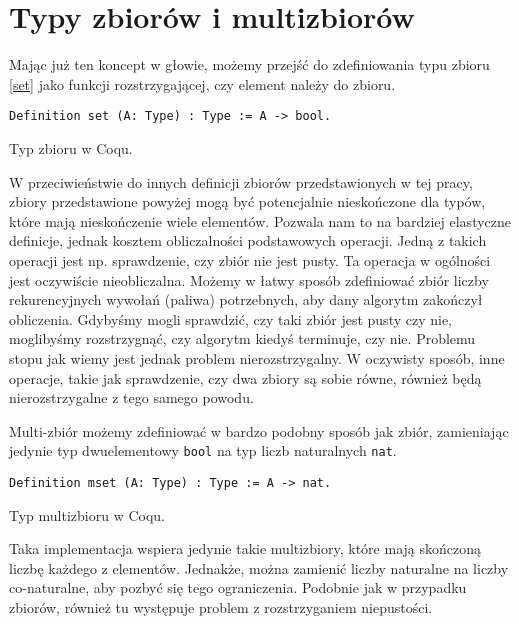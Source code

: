 \section{Typy zbiorów i multizbiorów}
Mając już ten koncept w głowie, możemy przejść do zdefiniowania typu zbioru \ref{set} jako funkcji rozstrzygającej, czy element należy do zbioru.
\begin{code}
\begin{verbatim}
Definition set (A: Type) : Type := A -> bool.
\end{verbatim}
\caption{Typ zbioru w Coqu.}
\label{set}
\end{code}
W przeciwieństwie do innych definicji zbiorów przedstawionych w tej pracy, zbiory przedstawione powyżej mogą być potencjalnie nieskończone dla typów, które mają nieskończenie wiele elementów. Pozwala nam to na bardziej elastyczne definicje, jednak kosztem obliczalności podstawowych operacji. Jedną z takich operacji jest np. sprawdzenie, czy zbiór nie jest pusty. Ta operacja w ogólności jest oczywiście nieobliczalna. Możemy w łatwy sposób zdefiniować zbiór liczby rekurencyjnych wywołań (paliwa) potrzebnych, aby dany algorytm zakończył obliczenia. Gdybyśmy mogli sprawdzić, czy taki zbiór jest pusty czy nie, moglibyśmy rozstrzygnąć, czy algorytm kiedyś terminuje, czy nie. Problemu stopu jak wiemy jest jednak problem nierozstrzygalny. W oczywisty sposób, inne operacje, takie jak sprawdzenie, czy dwa zbiory są sobie równe, również będą nierozstrzygalne z tego samego powodu.

Multi-zbiór możemy zdefiniować w bardzo podobny sposób \cite{mset} jak zbiór, zamieniając jedynie typ dwuelementowy \texttt{bool} na typ liczb naturalnych \texttt{nat}.
\begin{code}
\begin{verbatim}
Definition mset (A: Type) : Type := A -> nat.
\end{verbatim}
\caption{Typ multizbioru w Coqu.}
\label{mset}
\end{code}
Taka implementacja wspiera jedynie takie multizbiory, które mają skończoną liczbę każdego z elementów. Jednakże, można zamienić liczby naturalne na liczby co-naturalne, aby pozbyć się tego ograniczenia. Podobnie jak w przypadku zbiorów, również tu występuje problem z rozstrzyganiem niepustości.
